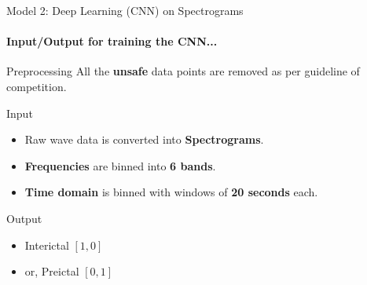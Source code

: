 \documentclass{beamer}
\begin{document}
\begin{frame}{Model 2: Deep Learning (CNN) on Spectrograms}
  \framesubtitle{Input/Output for training the CNN...}

  \begin{block}{Preprocessing}
    All the \textbf{unsafe} data points are removed as per guideline of
    competition.
  \end{block}
  
  \begin{block}{Input}
    \begin{itemize}
    \item Raw wave data is converted into \textbf{Spectrograms}.
    \item \textbf{Frequencies} are binned into \textbf{6 bands}.
    \item \textbf{Time domain} is binned with windows of \textbf{20 seconds} each.
    \end{itemize}
  \end{block}  

  \begin{block}{Output}
    \begin{itemize}
      \item Interictal $[1, 0]$
      \item or, Preictal   $[0, 1]$
    \end{itemize}
  \end{block}  

\end{frame}
\end{document}
